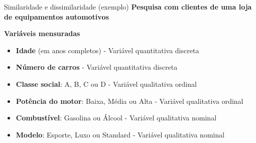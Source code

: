 \documentclass[
  ignorenonframetext,
  aspectratio=169,
]{beamer}
\begin{document}
\begin{frame}{Similaridade e dissimilaridade (exemplo)}
\label{similaridade-e-dissimilaridade-exemplo}
\textbf{Pesquisa com clientes de uma loja de equipamentos automotivos}

\pause

\textbf{Variáveis mensuradas}

\begin{itemize}
\item
  \textbf{Idade} (em anos completos) - Variável quantitativa discreta
\item
  \textbf{Número de carros} - Variável quantitativa discreta
\item
  \textbf{Classe social}: A, B, C ou D - Variável qualitativa ordinal
\item
  \textbf{Potência do motor}: Baixa, Média ou Alta - Variável
  qualitativa ordinal
\item
  \textbf{Combustível}: Gasolina ou Álcool - Variável qualitativa
  nominal
\item
  \textbf{Modelo}: Esporte, Luxo ou Standard - Variável qualitativa
  nominal
\end{itemize}
\end{frame}
\end{document}
